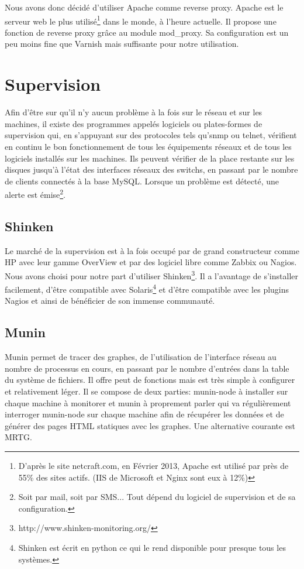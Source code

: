 \documentclass[a4paper,oneside]{report}
\begin{document}
Nous avons donc décidé d'utiliser Apache comme reverse proxy. Apache est le serveur web le plus utilisé\footnote{D'après le site netcraft.com, en Février 2013, Apache est utilisé par près de 55\% des sites actifs. (IIS de Microsoft et Nginx sont eux à 12\%)} dans le monde, à l'heure actuelle.
Il propose une fonction de reverse proxy grâce au module mod\_proxy. Sa configuration est un peu moins fine que Varnish mais suffisante pour notre utilisation.

\section{Supervision}
Afin d'être sur qu'il n'y aucun problème à la fois sur le réseau et sur les machines, il existe des programmes appelés logiciels ou plates-formes de supervision qui, en s'appuyant sur des protocoles tels qu'\gls{snmp} ou \gls{telnet}, vérifient en continu le bon fonctionnement de tous les équipements réseaux et de tous les logiciels installés sur les machines.
Ils peuvent vérifier de la place restante sur les disques jusqu'à l'état des interfaces réseaux des \glspl{switch}, en passant par le nombre de clients connectés à la base MySQL.
Lorsque un problème est détecté, une alerte est émise\footnote{Soit par mail, soit par SMS... Tout dépend du logiciel de supervision et de sa configuration.}.


\subsection{Shinken}
Le marché de la supervision est à la fois occupé par de grand constructeur comme HP avec leur gamme OverView et par des logiciel libre comme Zabbix ou Nagios.
Nous avons choisi pour notre part d'utiliser Shinken\footnote{http://www.shinken-monitoring.org/}.
Il a l'avantage de s'installer facilement, d'être compatible avec Solaris\footnote{Shinken est écrit en python ce qui le rend disponible pour presque tous les systèmes.} et d'être compatible avec les plugins Nagios et ainsi de bénéficier de son immense communauté.

\subsection{Munin}
Munin permet de tracer des graphes, de l'utilisation de l'interface réseau au nombre de processus en cours, en passant par le nombre d'entrées dans la table du système de fichiers. Il offre peut de fonctions mais est très simple à configurer et relativement léger.\newline
Il se compose de deux parties: munin-node à installer sur chaque machine à monitorer et munin à proprement parler qui va régulièrement interroger munin-node sur chaque machine afin de récupérer les données et de générer des pages HTML statiques avec les graphes.\newline
Une alternative courante est MRTG.
\end{document}
